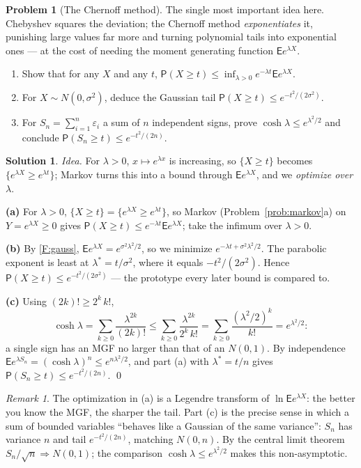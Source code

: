 \documentclass[14pt]{extarticle}
\theoremstyle{definition}
\newtheorem{exercise}{Problem}
\newtheorem*{solution}{Solution}
\theoremstyle{remark}
\newtheorem*{remark}{Remark}
\newcommand\expc{\mathsf{E}}
\newcommand\prb{\mathsf{P}}
\begin{document}
\begin{exercise}[The Chernoff method]\label{prob:chernoff}
The single most important idea here. Chebyshev squares the deviation; the Chernoff method \emph{exponentiates} it, punishing large values far more and turning polynomial tails into exponential ones --- at the cost of needing the moment generating function $\expc e^{\lambda X}$.
\begin{enumerate}[label=(\alph*)]
\item Show that for any $X$ and any $t$, $\prb(X\ge t)\le\inf_{\lambda>0}e^{-\lambda t}\expc e^{\lambda X}$.
\item For $X\sim N(0,\sigma^2)$, deduce the Gaussian tail $\prb(X\ge t)\le e^{-t^2/(2\sigma^2)}$.
\item For $S_n=\sum_{i=1}^n\varepsilon_i$ a sum of $n$ independent signs, prove $\cosh\lambda\le e^{\lambda^2/2}$ and conclude $\prb(S_n\ge t)\le e^{-t^2/(2n)}$.
\end{enumerate}
\end{exercise}
\begin{solution}
\emph{Idea.} For $\lambda>0$, $x\mapsto e^{\lambda x}$ is increasing, so $\{X\ge t\}$ becomes $\{e^{\lambda X}\ge e^{\lambda t}\}$; Markov turns this into a bound through $\expc e^{\lambda X}$, and we \emph{optimize over $\lambda$}.

\textbf{(a)} For $\lambda>0$, $\{X\ge t\}=\{e^{\lambda X}\ge e^{\lambda t}\}$, so Markov (Problem~\ref{prob:markov}a) on $Y=e^{\lambda X}\ge0$ gives $\prb(X\ge t)\le e^{-\lambda t}\expc e^{\lambda X}$; take the infimum over $\lambda>0$.

\textbf{(b)} By \ref{F:gauss}, $\expc e^{\lambda X}=e^{\sigma^2\lambda^2/2}$, so we minimize $e^{-\lambda t+\sigma^2\lambda^2/2}$. The parabolic exponent is least at $\lambda^*=t/\sigma^2$, where it equals $-t^2/(2\sigma^2)$. Hence $\prb(X\ge t)\le e^{-t^2/(2\sigma^2)}$ --- the prototype every later bound is compared to.

\textbf{(c)} Using $(2k)!\ge2^k\,k!$,
\[
\cosh\lambda=\sum_{k\ge0}\frac{\lambda^{2k}}{(2k)!}\le\sum_{k\ge0}\frac{\lambda^{2k}}{2^k\,k!}=\sum_{k\ge0}\frac{(\lambda^2/2)^k}{k!}=e^{\lambda^2/2}:
\]
a single sign has an MGF no larger than that of an $N(0,1)$. By independence $\expc e^{\lambda S_n}=(\cosh\lambda)^n\le e^{n\lambda^2/2}$, and part (a) with $\lambda^*=t/n$ gives $\prb(S_n\ge t)\le e^{-t^2/(2n)}$. \qed
\end{solution}
\begin{remark}
The optimization in (a) is a Legendre transform of $\ln\expc e^{\lambda X}$: the better you know the MGF, the sharper the tail. Part (c) is the precise sense in which a sum of bounded variables ``behaves like a Gaussian of the same variance'': $S_n$ has variance $n$ and tail $e^{-t^2/(2n)}$, matching $N(0,n)$. By the central limit theorem $S_n/\sqrt n\Rightarrow N(0,1)$; the comparison $\cosh\lambda\le e^{\lambda^2/2}$ makes this non-asymptotic.
\end{remark}
\end{document}
